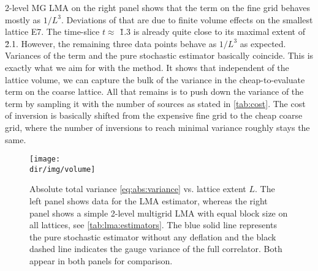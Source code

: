 2-level MG LMA on the right panel shows that the  term on the fine grid behaves mostly as $1/L^{3}$.
Deviations of that are due to finite volume effects on the smallest lattice E7.
The time-slice $t \approx $ \u{1.3}{\femto \metre} is already quite close to its maximal extent of \u{2.1}{\femto \metre}.
However, the remaining three data points behave as $1/L^{3}$ as expected.
Variances of the  term and the pure stochastic estimator basically coincide.
This is exactly what we aim for with the method.
It shows that independent of the lattice volume, we can capture the bulk of the variance in the cheap-to-evaluate  term on the coarse lattice.
All that remains is to push down the variance of the  term by sampling it with the number of sources as stated in \cref{tab:cost}.
The cost of inversion is basically shifted from the expensive fine grid to the cheap coarse grid, where the number of inversions to reach minimal variance roughly stays the same.

\begin{figure}
\centering
\texttt{[image: \\dir/img/volume]}
\caption{
Absolute total variance \cref{eq:abs:variance} vs. lattice extent $L$.
The left panel shows data for the LMA estimator, whereas the right panel shows a simple 2-level multigrid LMA with equal block size on all lattices, see \cref{tab:lma:estimators}.
The blue solid line represents the pure stochastic estimator without any deflation and the black dashed line indicates the gauge variance of the full correlator. Both appear in both panels for comparison.
\takenfull
}
\label{fig:var:vs:volume}
\end{figure}


